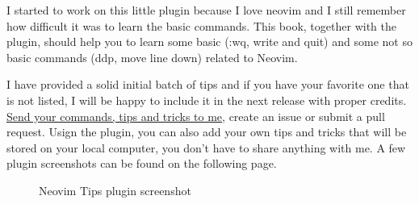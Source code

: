 I started to work on this little plugin because I love neovim and I still remember how difficult it was to learn the basic commands. This book, together with the plugin, should help you to learn some basic (:wq, write and quit) and some not so basic commands (ddp, move line down) related to Neovim.

I have provided a solid initial batch of tips and if you have your favorite one that is not listed, I will be happy to include it in the next release with proper credits. \href{mailto:smalltux@yahoo.com}{Send your commands, tips and tricks to me}, create an issue or submit a pull request. Usign the plugin, you can also add your own tips and tricks that will be stored on your local computer, you don't have to share anything with me. A few plugin screenshots can be found on the following page.

\begin{figure}[h]
  \centering
  \vspace{-2em}
  \caption*{Neovim Tips plugin screenshot}
\end{figure}

\vspace{1cm}

\clearpage
